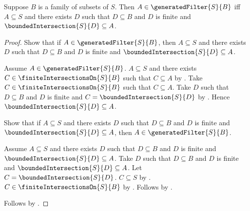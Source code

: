 \begin{theorem}\label{generated_filter_iff_finite_intersections}
    Suppose $B$ is a family of subsets of $S$.
    Then $A\in\generatedFilter{S}{B}$ iff $A\subseteq S$ and
        there exists $D$ such that $D\subseteq B$ and $D$ is finite and
            $\boundedIntersection{S}{D}\subseteq A$.
\end{theorem}
\begin{proof}
    Show that if $A\in\generatedFilter{S}{B}$, then $A\subseteq S$ and
        there exists $D$ such that $D\subseteq B$ and $D$ is finite and
            $\boundedIntersection{S}{D}\subseteq A$.
    \begin{subproof}
        Assume $A\in\generatedFilter{S}{B}$.
        $A\subseteq S$ and there exists
            $C\in\finiteIntersectionsOn{S}{B}$ such that $C\subseteq A$
            by .
        Take $C\in\finiteIntersectionsOn{S}{B}$ such that $C\subseteq A$.
        Take $D$ such that $D\subseteq B$ and $D$ is finite and
            $C=\boundedIntersection{S}{D}$
            by .
        Hence $\boundedIntersection{S}{D}\subseteq A$.
    \end{subproof}

    Show that if $A\subseteq S$ and there exists $D$ such that
        $D\subseteq B$ and $D$ is finite and
        $\boundedIntersection{S}{D}\subseteq A$, then
        $A\in\generatedFilter{S}{B}$.
    \begin{subproof}
        Assume $A\subseteq S$ and there exists $D$ such that
            $D\subseteq B$ and $D$ is finite and
            $\boundedIntersection{S}{D}\subseteq A$.
        Take $D$ such that $D\subseteq B$ and $D$ is finite and
            $\boundedIntersection{S}{D}\subseteq A$.
        Let $C=\boundedIntersection{S}{D}$.
        $C\subseteq S$ by .
        $C\in\finiteIntersectionsOn{S}{B}$ by
            .
        Follows by
            .
    \end{subproof}
    Follows by \auto.
\end{proof}

